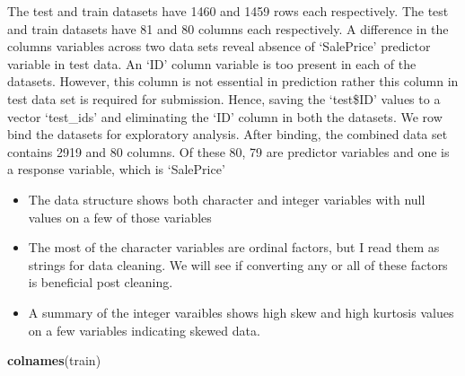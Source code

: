\documentclass[]{article}
\newenvironment{Shaded}{\begin{snugshade}}{\end{snugshade}}
\newcommand{\KeywordTok}[1]{\textcolor[rgb]{0.13,0.29,0.53}{\textbf{#1}}}
\newcommand{\NormalTok}[1]{#1}
\providecommand{\tightlist}{%
  \setlength{\itemsep}{0pt}\setlength{\parskip}{0pt}}
\begin{document}
The test and train datasets have 1460 and 1459 rows each respectively.
The test and train datasets have 81 and 80 columns each respectively. A
difference in the columns variables across two data sets reveal absence
of `SalePrice' predictor variable in test data. An `ID' column variable
is too present in each of the datasets. However, this column is not
essential in prediction rather this column in test data set is required
for submission. Hence, saving the `test\$ID' values to a vector
`test\_ids' and eliminating the `ID' column in both the datasets. We row
bind the datasets for exploratory analysis. After binding, the combined
data set contains 2919 and 80 columns. Of these 80, 79 are predictor
variables and one is a response variable, which is `SalePrice'

\begin{itemize}
\tightlist
\item
  The data structure shows both character and integer variables with
  null values on a few of those variables
\item
  The most of the character variables are ordinal factors, but I read
  them as strings for data cleaning. We will see if converting any or
  all of these factors is beneficial post cleaning.
\item
  A summary of the integer varaibles shows high skew and high kurtosis
  values on a few variables indicating skewed data.
\end{itemize}

\begin{Shaded}
\begin{Highlighting}[]
\KeywordTok{colnames}\NormalTok{(train)}
\end{Highlighting}
\end{Shaded}
\end{document}
